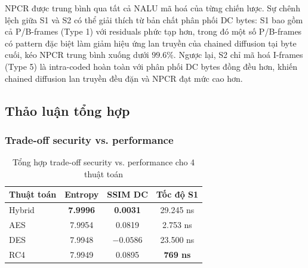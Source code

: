NPCR được trung bình qua tất cả NALU mã hoá của từng chiến lược. Sự chênh lệch giữa S1 và S2 có thể giải thích từ bản chất phân phối DC bytes: S1 bao gồm cả P/B-frames (Type 1) với residuals phức tạp hơn, trong đó một số P/B-frames có pattern đặc biệt làm giảm hiệu ứng lan truyền của chained diffusion tại byte cuối, kéo NPCR trung bình xuống dưới $99.6\%$. Ngược lại, S2 chỉ mã hoá I-frames (Type 5) là intra-coded hoàn toàn với phân phối DC bytes đồng đều hơn, khiến chained diffusion lan truyền đều đặn và NPCR đạt mức cao hơn.

\subsection{Thảo luận tổng hợp}

\subsubsection{Trade-off security vs. performance}

\begin{table}[ht]
\centering
\caption{Tổng hợp trade-off security vs. performance cho 4 thuật toán}
\label{tab:tradeoff}
\begin{tabular}{|l|c|c|c|}
\hline
\textbf{Thuật toán} & \textbf{Entropy} & \textbf{SSIM DC} & \textbf{Tốc độ S1} \\
\hline
Hybrid & \textbf{7.9996} & \textbf{0.0031} & 29.245 ns \\
\hline
AES    & 7.9954 & 0.0819 & 2.753 ns \\
\hline
DES    & 7.9948 & $-0.0586$ & 23.500 ns \\
\hline
RC4    & 7.9949 & 0.0895 & \textbf{769 ns} \\
\hline
\end{tabular}
\end{table}

